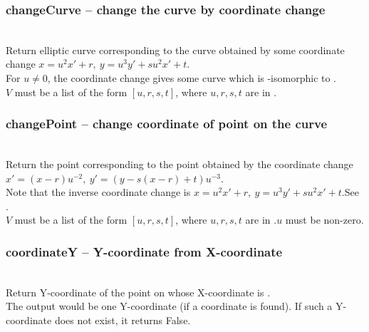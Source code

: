   \subsubsection{changeCurve -- change the curve by coordinate change}
   \\
   \spacing
   \quad Return elliptic curve corresponding to the curve obtained by some coordinate change $x=u^2x'+r,\ y=u^3y'+su^2x'+t$.\\
   \spacing
   \quad For $u \ne 0$, the coordinate change gives some curve which is -isomorphic to .\\
   \spacing
   \quad $V$ must be a list of the form $[u,r,s,t]$, where $u,r,s,t$ are in .\\
%
  \subsubsection{changePoint -- change coordinate of point on the curve}
   \\
   \spacing
   \quad Return the point corresponding to the point obtained by the coordinate change $x'=(x-r) u^{-2},\ y'=(y-s(x-r)+t)u^{-3}$.\\
   \spacing
   \quad Note that the inverse coordinate change is $x=u^2x'+r,\ y=u^3y'+su^2x'+t$.See .\\
   \spacing
   \quad $V$ must be a list of the form $[u,r,s,t]$, where $u,r,s,t$ are in .$u$ must be non-zero.\\
%
  \subsubsection{coordinateY -- Y-coordinate from X-coordinate}
   \\
   \spacing
   \quad Return Y-coordinate of the point on   whose X-coordinate is .\\
   \spacing
   \quad The output would be one Y-coordinate (if a coordinate is found).
   If such a Y-coordinate does not exist,  it returns False.\\
%
